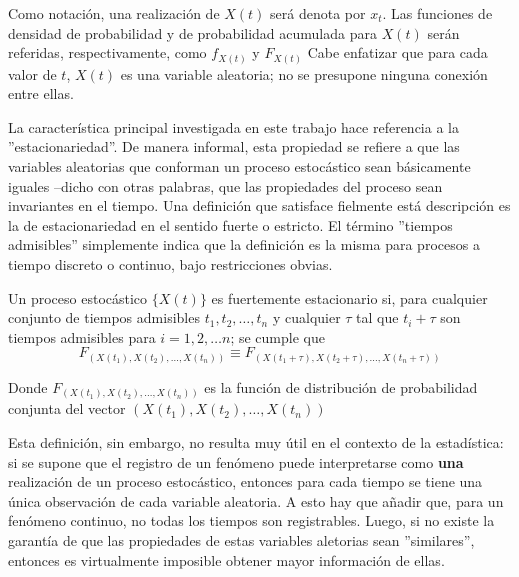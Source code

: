 Como notaci\'on, una realizaci\'on de $X(t)$ ser\'a denota por $x_t$. 
Las funciones de densidad de probabilidad y de probabilidad acumulada para $X(t)$ ser\'an
referidas, respectivamente, como $f_{X(t)}$ y $F_{X(t)}$
Cabe enfatizar que para cada valor de $t$,
$X(t)$ es una variable aleatoria; no se presupone ninguna conexi\'on entre ellas.


La caracter\'istica principal 
investigada en este trabajo hace referencia a la ''estacionariedad''. De manera 
informal, esta propiedad se refiere a que las variables aleatorias que conforman un proceso
estoc\'astico sean b\'asicamente iguales --dicho con otras palabras, que las propiedades
del proceso sean invariantes en el tiempo. 
Una definici\'on que satisface fielmente est\'a descripci\'on es la de estacionariedad 
en el sentido fuerte o estricto.
El t\'ermino ''tiempos admisibles'' simplemente indica que la definici\'on es la misma para
procesos a tiempo discreto o continuo, bajo restricciones obvias.

\begin{defn}
Un proceso estoc\'astico $\{ X(t) \}$ es fuertemente estacionario si, para cualquier 
conjunto de tiempos admisibles $t_1,t_2,\dots,t_n$ y cualquier $\tau$ tal que 
 $t_i+\tau$ son tiempos admisibles para $i = 1, 2, \dots n$;
se cumple que
\begin{equation*}
F_{\left(X(t_1),X(t_2),\dots,X(t_n)\right) }
\equiv
F_{\left(X(t_1+\tau),X(t_2+\tau),\dots,X(t_n+\tau)\right)}
\end{equation*}

Donde $F_{\left(X(t_1),X(t_2),\dots,X(t_n)\right) }$ es la funci\'on de distribuci\'on de
probabilidad conjunta del vector $\left(X(t_1),X(t_2),\dots,X(t_n)\right)$
\end{defn}

Esta definici\'on, sin embargo, no resulta muy \'util en el contexto de la estad\'istica:
si se supone que el registro de un fen\'omeno puede interpretarse como \textbf{una} 
realizaci\'on de
un proceso estoc\'astico, entonces para cada tiempo se tiene una \'unica observaci\'on
de cada variable aleatoria. A esto hay que a\~nadir que, para un fen\'omeno continuo,
no todas los tiempos son registrables.
Luego, si no existe la garant\'ia de que las propiedades de estas variables aletorias sean
''similares'', entonces es virtualmente imposible obtener mayor informaci\'on de ellas.

